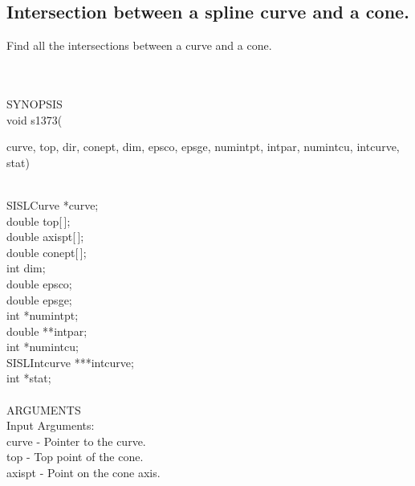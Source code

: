 \subsection{Intersection between a spline curve and a cone.} \label{sec:s1373}
\begin{minipg1}
  Find all the intersections between a curve and a cone.
\end{minipg1} \\ \\
SYNOPSIS\\
        \>void s1373(\begin{minipg3}
         {\fov curve}, {\fov top}, {\fov dir}, {\fov conept}, {\fov dim}, {\fov epsco}, {\fov epsge}, {\fov numintpt}, {\fov intpar},
                        {\fov numintcu}, {\fov intcurve}, {\fov stat})
                \end{minipg3}\\[0.3ex]
                \>\>    SISLCurve       \>      *{\fov curve};\\
                \>\>    double  \>      {\fov top}[\,];\\
                \>\>    double  \>      {\fov axispt}[\,];\\
                \>\>    double  \>      {\fov conept}[\,];\\
                \>\>    int     \>      {\fov dim};\\
                \>\>    double  \>      {\fov epsco};\\
                \>\>    double  \>      {\fov epsge};\\
                \>\>    int     \>      *{\fov numintpt};\\
                \>\>    double  \>      **{\fov intpar};\\
                \>\>    int     \>      *{\fov numintcu};\\
                \>\>    SISLIntcurve \> ***{\fov intcurve};\\
                \>\>    int     \>      *{\fov stat};\\
\\
ARGUMENTS\\
        \>Input Arguments:\\
        \>\>    {\fov curve}    \> - \> Pointer to the curve.\\
        \>\>    {\fov top}      \> - \> Top point of the cone.\\
        \>\>    {\fov axispt}   \> - \> Point on the cone axis.\\
